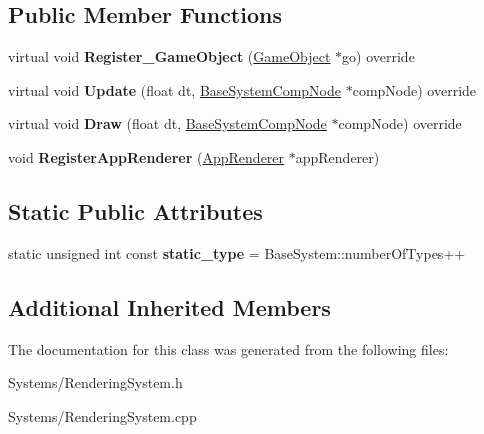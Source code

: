 \subsection*{Public Member Functions}
\begin{DoxyCompactItemize}
\item 
\mbox{\label{classRenderingSystem_ab2cc7b17f6ab2201994450081f120f78}} 
virtual void {\bfseries Register\+\_\+\+Game\+Object} (\hyperlink{classGameObject}{Game\+Object} $\ast$go) override
\item 
\mbox{\label{classRenderingSystem_a658cdef75c3fc6d555347fb787eec460}} 
virtual void {\bfseries Update} (float dt, \hyperlink{structBaseSystemCompNode}{Base\+System\+Comp\+Node} $\ast$comp\+Node) override
\item 
\mbox{\label{classRenderingSystem_ad09a69b504d3cd12c0e0c7d36352b2b5}} 
virtual void {\bfseries Draw} (float dt, \hyperlink{structBaseSystemCompNode}{Base\+System\+Comp\+Node} $\ast$comp\+Node) override
\item 
\mbox{\label{classRenderingSystem_a5c20d01e1b0004d87c97e4d376968cad}} 
void {\bfseries Register\+App\+Renderer} (\hyperlink{classAppRenderer}{App\+Renderer} $\ast$app\+Renderer)
\end{DoxyCompactItemize}
\subsection*{Static Public Attributes}
\begin{DoxyCompactItemize}
\item 
\mbox{\label{classRenderingSystem_aec9ac56134f6e5ef071be60a218dc7ca}} 
static unsigned int const {\bfseries static\+\_\+type} = Base\+System\+::number\+Of\+Types++
\end{DoxyCompactItemize}
\subsection*{Additional Inherited Members}


The documentation for this class was generated from the following files\+:\begin{DoxyCompactItemize}
\item 
Systems/Rendering\+System.\+h\item 
Systems/Rendering\+System.\+cpp\end{DoxyCompactItemize}
